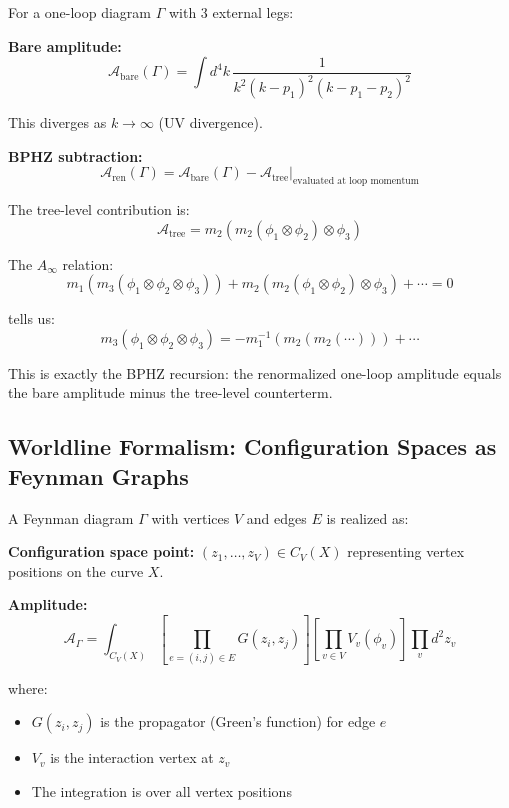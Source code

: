 \begin{example}
\label{ex:bphz-one-loop}
For a one-loop diagram $\Gamma$ with 3 external legs:

\textbf{Bare amplitude:}
$$\mathcal{A}_{\text{bare}}(\Gamma) = \int d^4k \, 
\frac{1}{k^2(k-p_1)^2(k-p_1-p_2)^2}$$

This diverges as $k \to \infty$ (UV divergence).

\textbf{BPHZ subtraction:}
$$\mathcal{A}_{\text{ren}}(\Gamma) = \mathcal{A}_{\text{bare}}(\Gamma) - 
\mathcal{A}_{\text{tree}}|_{\text{evaluated at loop momentum}}$$

The tree-level contribution is:
$$\mathcal{A}_{\text{tree}} = m_2(m_2(\phi_1 \otimes \phi_2) \otimes \phi_3)$$

The $A_\infty$ relation:
$$m_1(m_3(\phi_1 \otimes \phi_2 \otimes \phi_3)) + m_2(m_2(\phi_1 \otimes \phi_2) 
\otimes \phi_3) + \cdots = 0$$

tells us:
$$m_3(\phi_1 \otimes \phi_2 \otimes \phi_3) = -m_1^{-1}(m_2(m_2(\cdots))) + \cdots$$

This is exactly the BPHZ recursion: the renormalized one-loop amplitude equals the 
bare amplitude minus the tree-level counterterm.
\end{example}

\subsection{Worldline Formalism: Configuration Spaces as Feynman Graphs}

\begin{definition}
\label{def:worldline-formalism}
A Feynman diagram $\Gamma$ with vertices $V$ and edges $E$ is realized as:

\textbf{Configuration space point:} $(z_1,\ldots,z_V) \in C_V(X)$ representing 
vertex positions on the curve $X$.

\textbf{Amplitude:}
$$\mathcal{A}_\Gamma = \int_{C_V(X)} \left[\prod_{e=(i,j) \in E} G(z_i,z_j)\right] 
\left[\prod_{v \in V} V_v(\phi_v)\right] \prod_v d^2z_v$$

where:
\begin{itemize}
\item $G(z_i,z_j)$ is the propagator (Green's function) for edge $e$
\item $V_v$ is the interaction vertex at $z_v$
\item The integration is over all vertex positions
\end{itemize}
\end{definition}

